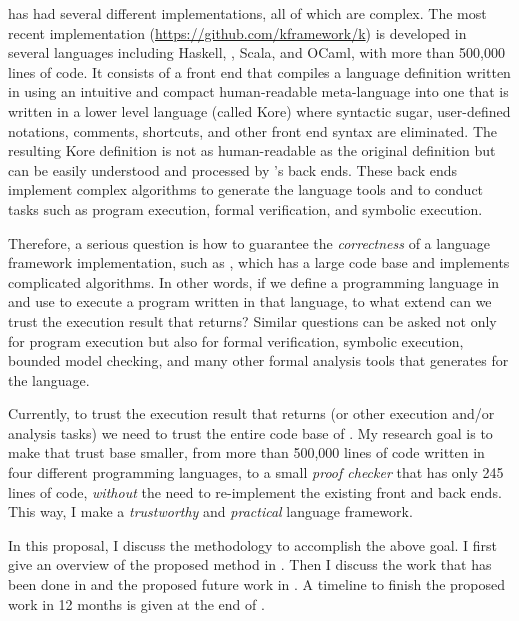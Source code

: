 \documentclass[11pt]{article}
\begin{document}
\K has had several different implementations, all of which are complex. 
The most recent \K implementation (\url{https://github.com/kframework/k})
is developed in several languages including
Haskell, \Cpp, Scala, and OCaml, with more than 500,000 lines of code.
It consists of a front end that compiles a language definition written in \K
using an intuitive and compact human-readable meta-language into 
one that is written in a lower level language (called Kore) where 
syntactic sugar, user-defined notations, comments, shortcuts, and other
front end syntax are eliminated.
The resulting Kore definition is not as human-readable as the original \K 
definition but can be easily understood and processed by \K's back ends.
These back ends implement complex algorithms to generate the language tools
and to conduct tasks such as program execution, formal verification, and 
symbolic execution. 

Therefore, a serious question is how to guarantee the \emph{correctness}
of a language framework implementation, such as \K,  which has a large code 
base and implements complicated algorithms.
In other words, if we define a programming language in \K and
use \K to execute a program written in that language, 
to what extend can we trust the execution result that \K returns?
Similar questions can be asked not only for program execution but also for
formal verification, symbolic execution, bounded model checking, 
and many other formal analysis tools that \K generates for the language.

Currently, to trust the execution result that \K returns
(or other execution and/or analysis tasks)
we need to trust the 
entire code base of \K.
My research goal is to make that trust base smaller, from more than
500,000 lines of code written in four different programming languages,
to a small \emph{proof checker}
\cite{ml-checker}
that has only 245 lines of code, \emph{without} the need to re-implement the 
existing \K
front and back ends. 
This way, I make \K a \emph{trustworthy} and \emph{practical} language 
framework.

In this proposal, I discuss the methodology to accomplish the above goal. 
I first give an overview of the proposed method in .
Then I discuss the work that has been done in 
and the proposed future work in . 
A timeline to finish the proposed work in 12 months is given at the end of . 
\end{document}
